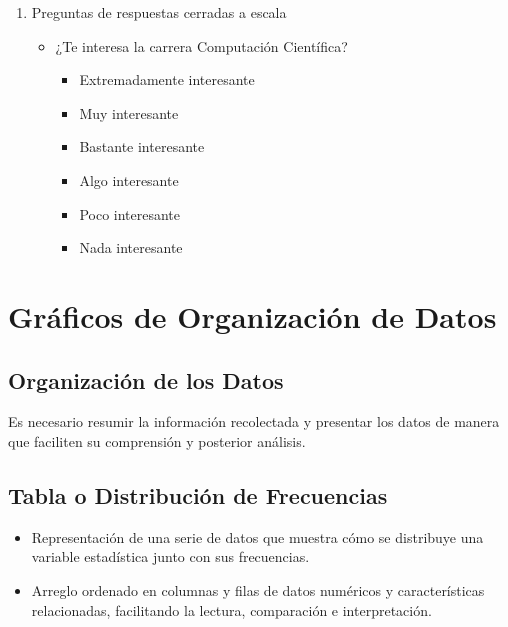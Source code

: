 \documentclass{article}
\begin{document}
\begin{enumerate}[label=\arabic*.]
                \item Preguntas de respuestas cerradas a escala
                    \begin{itemize}
                        \item ¿Te interesa la carrera Computación Científica?
                            \begin{multicols}{2}
                            \begin{itemize}
                            \item Extremadamente interesante
                            \item Muy interesante
                            \item Bastante interesante
                            \item Algo interesante
                            \item Poco interesante
                            \item Nada interesante
                            \end{itemize}
                            \end{multicols}
                    \end{itemize}
            \end{enumerate}

\section{Gráficos de Organización de Datos}
    \subsection{Organización de los Datos}
        Es necesario resumir la información recolectada y presentar los datos de manera que faciliten su comprensión y posterior análisis.

    \subsection{Tabla o Distribución de Frecuencias}
        \begin{itemize}
            \item Representación de una serie de datos que muestra cómo se distribuye una variable estadística junto con sus frecuencias.
            \item Arreglo ordenado en columnas y filas de datos numéricos y características relacionadas, facilitando la lectura, comparación e interpretación.
        \end{itemize}
\end{document}
